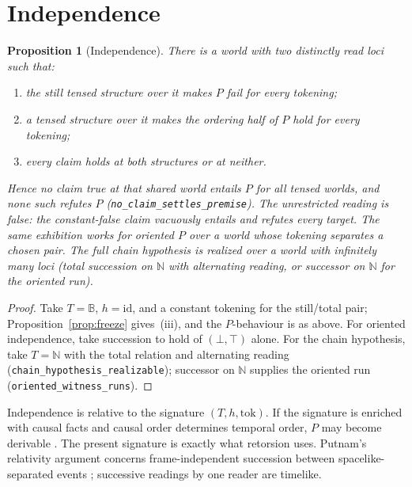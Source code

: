 \documentclass[11pt]{article}
\newtheorem{proposition}[theorem]{Proposition}
\newcommand{\lf}[1]{\texttt{#1}}
\newcommand{\B}{\mathbb{B}}
\begin{document}
\section{Independence}
\label{sec:indep}

\begin{proposition}[Independence]
\label{prop:independence}
There is a world with two distinctly read loci such that:
\begin{enumerate}[label=(\roman*),itemsep=1pt]
\item the still tensed structure over it makes \(P\) fail for every tokening;
\item a tensed structure over it makes the ordering half of \(P\) hold for
every tokening;
\item every claim holds at both structures or at neither.
\end{enumerate}
Hence no claim \emph{true at that shared world} entails \(P\) for all tensed
worlds, and none such refutes \(P\)
(\lf{no\_claim\_settles\_premise}). The unrestricted reading is false: the
constant-false claim vacuously entails and refutes every target. The same
exhibition works for oriented \(P\) over a world whose tokening separates a
chosen pair. The full chain hypothesis is realized over a world with infinitely
many loci (total succession on \(\mathbb{N}\) with alternating reading, or
successor on \(\mathbb{N}\) for the oriented run).
\end{proposition}

\begin{proof}
Take \(T=\B\), \(h=\mathrm{id}\), and a constant tokening for the still/total
pair; Proposition~\ref{prop:freeze} gives~(iii), and the \(P\)-behaviour is as
above. For oriented independence, take succession to hold of \((\bot,\top)\)
alone. For the chain hypothesis, take \(T=\mathbb{N}\) with the total relation
and alternating reading (\lf{chain\_hypothesis\_realizable}); successor on
\(\mathbb{N}\) supplies the oriented run (\lf{oriented\_witness\_runs}).
\end{proof}

Independence is relative to the signature \((T,h,\mathrm{tok})\). If the
signature is enriched with causal facts and causal order determines temporal
order, \(P\) may become derivable \cite{mellor1998}. The present signature is
exactly what retorsion uses. Putnam's relativity argument concerns
frame-independent succession between spacelike-separated events
\cite{putnam1967}; successive readings by one reader are timelike.
\end{document}
